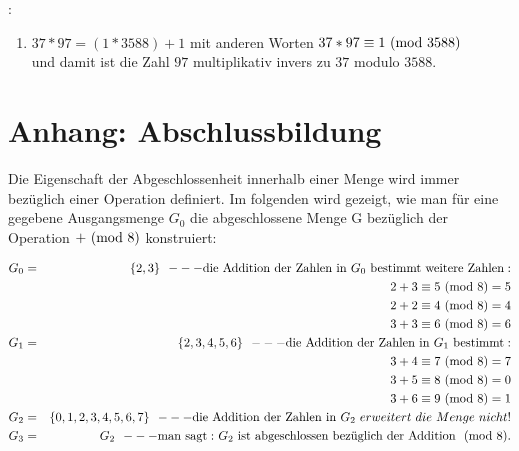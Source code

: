 \begin{refsegment}
\begin{example}{:}
\begin{enumerate}
   \item $37*97 = (1*3588)+1$ mit anderen Worten $37*97 \equiv 1 {\rm ~(mod~} 3588)$\\
                 und damit ist die Zahl $97$ multiplikativ invers zu $37$ modulo $3588$.

\end{enumerate}

\end{example}



\newpage
\hypertarget{nt:NumberTheory_Appendix_B}{}
\section{Anhang: Abschlussbildung}
\label{nt:NumberTheory_Appendix_B}{}

Die Eigenschaft der Abgeschlossenheit innerhalb einer Menge
wird immer bezüglich einer Operation definiert.
Im folgenden wird gezeigt, wie man für eine gegebene Ausgangsmenge $G_0$ die
abgeschlossene Menge G bezüglich der Operation $+ {\rm ~(mod~} 8)$ konstruiert:

\begin{eqnarray*}
G_0 & = & \{ 2, 3 \} {\rm ~~--- die~Addition~der~Zahlen~in~} G_0
{\rm ~bestimmt~weitere~Zahlen:} \nonumber\\
    & &    2 + 3 \equiv 5{\rm ~(mod~}8) = 5 \nonumber\\
    & &    2 + 2 \equiv 4{\rm ~(mod~}8) = 4 \nonumber\\
    & &    3 + 3 \equiv 6{\rm ~(mod~}8) = 6 \nonumber\\
G_1 & = & \{ 2, 3, 4, 5, 6 \} {\rm ~~--- die~Addition~der~Zahlen~in~} G_1
{\rm ~bestimmt:}\nonumber\\
    & &    3 + 4 \equiv 7{\rm ~(mod~}8) = 7 \nonumber\\
    & &    3 + 5 \equiv 8{\rm ~(mod~}8) = 0 \nonumber\\
    & &    3 + 6 \equiv 9{\rm ~(mod~}8) = 1 \nonumber\\
G_2 & = & \{ 0, 1, 2, 3, 4, 5, 6, 7 \} {\rm ~~--- die~Addition~der~Zahlen~in~} G_2
{~erweitert~die~Menge~nicht!} \nonumber\\
G_3 & = & G_2 {\rm ~~--- man~sagt:~} G_2
\mbox{\rm~ist~abgeschlossen~bezüglich~der~Addition~~(mod~}8). \nonumber
\end{eqnarray*}




\end{refsegment}
